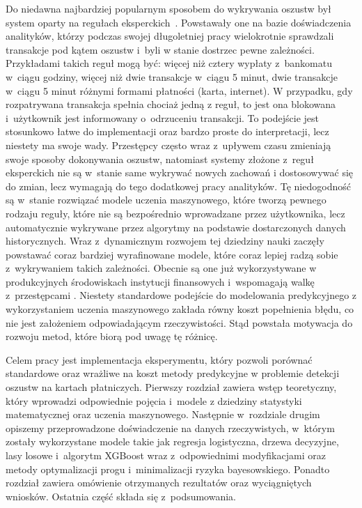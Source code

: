 \documentclass[inzynierska]{pwr_wmat_praca_dyplomowa}
\theoremstyle{plain}
\numberwithin{theorem}{chapter}
\theoremstyle{definition}
\numberwithin{theorem}{chapter}
\begin{document}
Do niedawna najbardziej popularnym sposobem do wykrywania oszustw był system oparty na regułach eksperckich~\cite{bahnsen_presentation}. Powstawały one na bazie doświadczenia analityków, którzy podczas swojej długoletniej pracy wielokrotnie sprawdzali transakcje pod kątem oszustw i~byli w stanie dostrzec pewne zależności. Przykładami takich reguł mogą być: więcej niż cztery wypłaty z~bankomatu w~ciągu godziny, więcej niż dwie transakcje w~ciągu 5 minut, dwie transakcje w~ciągu 5 minut różnymi formami płatności (karta, internet). W przypadku, gdy rozpatrywana transakcja spełnia chociaż jedną z reguł, to jest ona blokowana i~użytkownik jest informowany o~odrzuceniu transakcji. To podejście jest stosunkowo łatwe do implementacji oraz bardzo proste do interpretacji, lecz niestety ma swoje wady. Przestępcy często wraz z~upływem czasu zmieniają swoje sposoby dokonywania oszustw, natomiast systemy złożone z~reguł eksperckich nie są w~stanie same wykrywać nowych zachowań i dostosowywać się do zmian, lecz wymagają do tego dodatkowej pracy analityków. Tę niedogodność są w~stanie rozwiązać modele uczenia maszynowego, które tworzą pewnego rodzaju reguły, które nie są bezpośrednio wprowadzane przez użytkownika, lecz automatycznie wykrywane przez algorytmy na podstawie dostarczonych danych historycznych. Wraz z~dynamicznym rozwojem tej dziedziny nauki zaczęły powstawać coraz bardziej wyrafinowane modele, które coraz lepiej radzą sobie z~wykrywaniem takich zależności. Obecnie są one już wykorzystywane w produkcyjnych środowiskach instytucji finansowych i~wspomagają walkę z~przestępcami \cite{practitioner_perspective}. Niestety standardowe podejście do modelowania predykcyjnego z wykorzystaniem uczenia maszynowego zakłada równy koszt popełnienia błędu, co nie jest założeniem odpowiadającym rzeczywistości. Stąd powstała motywacja do rozwoju metod, które biorą pod uwagę tę różnicę.

Celem pracy jest implementacja eksperymentu, który pozwoli porównać standardowe oraz wrażliwe na koszt metody predykcyjne w problemie detekcji oszustw na kartach płatniczych. Pierwszy rozdział zawiera wstęp teoretyczny, który wprowadzi odpowiednie pojęcia i~modele z dziedziny statystyki matematycznej oraz uczenia maszynowego. Następnie w~rozdziale drugim opiszemy przeprowadzone doświadczenie na danych rzeczywistych, w~którym zostały wykorzystane modele takie jak regresja logistyczna, drzewa decyzyjne, lasy losowe i~algorytm XGBoost wraz z~odpowiednimi modyfikacjami oraz metody optymalizacji progu i~minimalizacji ryzyka bayesowskiego. Ponadto rozdział zawiera omówienie otrzymanych rezultatów oraz wyciągniętych wniosków. Ostatnia część składa się z~podsumowania.
\end{document}
